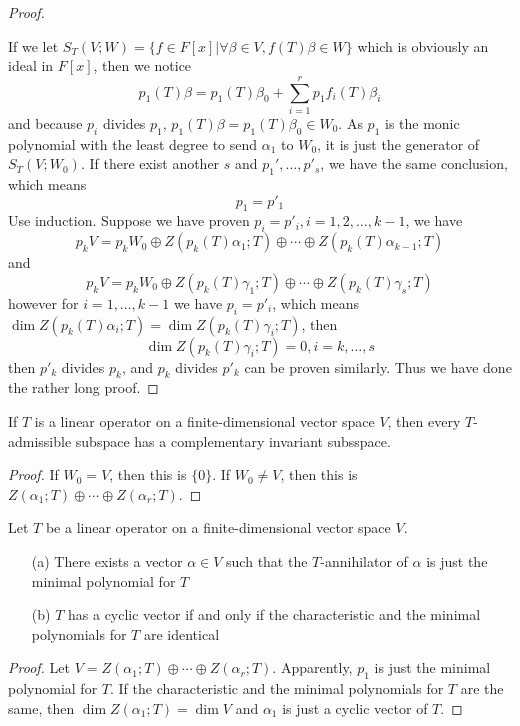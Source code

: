 \documentclass{article}
\begin{document}
\begin{proof}
\begin{enumerate}
	\end{enumerate}
	If we let $S_T(V;W)=\{f\in F[x]|\forall \beta\in V,f(T)\beta\in W\}$ which is obviously an ideal in $F[x]$, then we notice
	\[p_1(T)\beta=p_1(T)\beta_0+\sum_{i=1}^rp_1f_i(T)\beta_i\]
	and because $p_i$ divides $p_1$, $p_1(T)\beta=p_1(T)\beta_0\in W_0$. As $p_1$ is the monic polynomial with the least degree to send $\alpha_1$ to $W_0$, it is just the generator of $S_T(V;W_0)$. If there exist another $s$ and $p_1',\dots,p'_{s}$, we have the same conclusion, which means
	\[p_1=p'_1\]
	Use induction. Suppose we have proven $p_{i}=p'_i,i=1,2,\dots,k-1$, we have
	\[p_kV=p_kW_0\oplus Z(p_k(T)\alpha_1;T)\oplus\cdots\oplus Z(p_k(T)\alpha_{k-1};T)\]
	and
	\[p_kV=p_kW_0\oplus Z(p_k(T)\gamma_1;T)\oplus\cdots\oplus Z(p_k(T)\gamma_s;T)\]
	however for $i=1,\dots,k-1$ we have $p_{i}=p'_{i}$, which means $\dim Z(p_k(T)\alpha_{i};T)=\dim Z(p_k(T)\gamma_{i};T)$, then
	\[\dim Z(p_k(T)\gamma_i;T)=0,i=k,\dots,s\]
	then $p'_k$ divides $p_k$, and $p_k$ divides $p'_k$ can be proven similarly. Thus we have done the rather long proof.
\end{proof}
\begin{coro}
	If $T$ is a linear operator on a finite-dimensional vector space $V$, then every $T$-admissible subspace has a complementary invariant subsspace.
\end{coro}
\begin{proof}
	If $W_0=V$, then this is $\{0\}$. If $W_0\neq V$, then this is $Z(\alpha_1;T)\oplus\cdots\oplus Z(\alpha_r;T)$.
\end{proof}
\begin{coro}
	Let $T$ be a linear operator on a finite-dimensional vector space $V$.
	\begin{enumerate}
		\item [(a)]There exists a vector $\alpha\in V$ such that the $T$-annihilator of $\alpha$ is just the minimal polynomial for $T$
		\item [(b)]$T$ has a cyclic vector if and only if the characteristic and the minimal polynomials for $T$ are identical
	\end{enumerate}
\end{coro}
\begin{proof}
	Let $V=Z(\alpha_1;T)\oplus\cdots\oplus Z(\alpha_r;T)$. Apparently, $p_1$ is just the minimal polynomial for $T$. If the characteristic and the minimal polynomials for $T$ are the same, then $\dim Z(\alpha_1;T)=\dim V$ and $\alpha_1$ is just a cyclic vector of $T$.
\end{proof}
\end{document}
